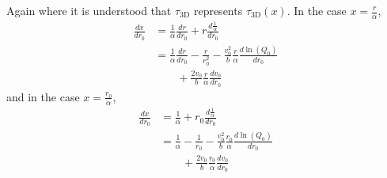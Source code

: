 \documentclass[aps,prl,twocolumn,showpacs,superscriptaddress,groupedaddress]{revtex4-1}  %
\begin{document}
Again where it is understood that $\tau_\text{3D}$ represents $\tau_\text{3D}(x)$.  In the case $x = \frac{r}{\alpha}$,
\begin{align}
  \frac{d x}{d r_0} &= \frac{1}{\alpha} \frac{d r}{d r_0} + r\frac{ d \frac{1}{\alpha}}{d r_0}\nonumber\\
                            &= \frac{1}{\alpha} \frac{d r}{d r_0} - \frac{r}{r_0^2} - \frac{v_0^2}{b}\frac{r}{\alpha} \frac{d \ln(Q_0)}{d r_0}\nonumber\\
                            &\quad\quad + \frac{2 v_0}{b}\frac{r}{\alpha} \frac{d v_0}{d r_0}\label{eq:dx over dr_0 for r over alpha}
\end{align}
and in the case $x = \frac{r_0}{\alpha}$,
\begin{align}
  \frac{d x}{d r_0} &= \frac{1}{\alpha}  + r_0\frac{ d \frac{1}{\alpha}}{d r_0}\nonumber\\
                            &= \frac{1}{\alpha}  - \frac{1}{r_0} - \frac{v_0^2}{b}\frac{r_0}{\alpha} \frac{d \ln(Q_0)}{d r_0}\nonumber\\
                            &\quad\quad + \frac{2 v_0}{b}\frac{r_0}{\alpha} \frac{d v_0}{d r_0}\label{eq:dx over dr_0 for r_0 over alpha}
\end{align}
\end{document}
